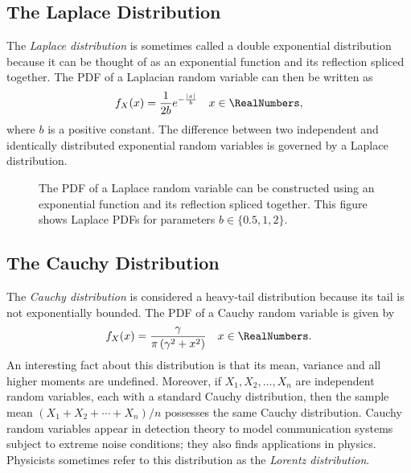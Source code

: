 \subsection{The Laplace Distribution}

The \emph{Laplace distribution} is sometimes called a double exponential distribution because it can be thought of as an exponential function and its reflection spliced together. 
The PDF of a Laplacian random variable can then be written as
\begin{equation*}
f_X (x) = \frac{1}{2b} e^{- \frac{|x|}{b}} \quad x \in \RealNumbers ,
\end{equation*}
where $b$ is a positive constant.
The difference between two independent and identically distributed exponential random variables is governed by a Laplace distribution.

\begin{figure}[ht]
\begin{center}
\end{center}
\caption{The PDF of a Laplace random variable can be constructed using an exponential function and its reflection spliced together.
This figure shows Laplace PDFs for parameters $b \in \{0.5, 1, 2 \}$.}
\end{figure}


\subsection{The Cauchy Distribution}

The \emph{Cauchy distribution} is considered a heavy-tail distribution because its tail is not exponentially bounded. 
The PDF of a Cauchy random variable is given by
\begin{equation*}
f_X (x) = \frac{ \gamma }{\pi \left( \gamma^2 + x^2 \right)} \quad x \in \RealNumbers .
\end{equation*}
An interesting fact about this distribution is that its mean, variance and all higher moments are undefined.
Moreover, if $X_1, X_2, \ldots, X_n$ are independent random variables, each with a standard Cauchy distribution, then the sample mean $(X_1 + X_2 + \cdots + X_n)/n$ possesses the same Cauchy distribution.
Cauchy random variables appear in detection theory to model communication systems subject to extreme noise conditions; they also finds applications in physics.
Physicists sometimes refer to this distribution as the \emph{Lorentz distribution}.

